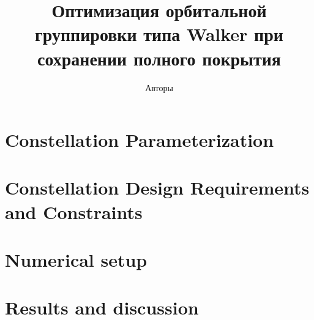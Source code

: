 \documentclass[12pt,a4paper]{article}
\title{Оптимизация орбитальной группировки типа Walker при сохранении полного покрытия}
\author{Авторы}
\date{}
\begin{document}
\maketitle





\section{Constellation Parameterization}



\section{Constellation Design Requirements and Constraints}










\section{Numerical setup}



\section{Results and discussion}



\appendix






\end{document}
